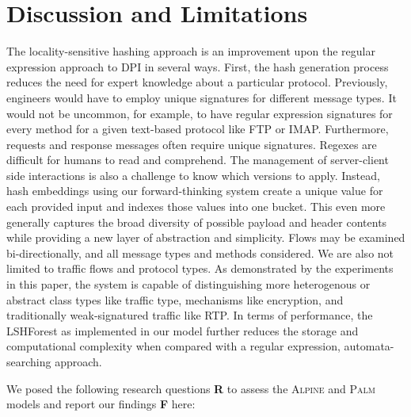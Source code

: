 \section{Discussion and Limitations}

The locality-sensitive hashing approach is an improvement upon the regular expression approach to DPI in several ways. First, the hash generation process reduces the need for expert knowledge about a particular protocol. Previously, engineers would have to employ unique signatures for different message types. It would not be uncommon, for example, to have regular expression signatures for every method for a given text-based protocol like FTP or IMAP. Furthermore, requests and response messages often require unique signatures. Regexes are difficult for humans to read and comprehend. The management of server-client side interactions is also a challenge to know which versions to apply. Instead, hash embeddings using our forward-thinking system create a unique value for each provided input and indexes those values into one bucket. This even more generally captures the broad diversity of possible payload and header contents while providing a new layer of abstraction and simplicity. Flows may be examined bi-directionally, and all message types and methods considered. We are also not limited to traffic flows and protocol types. As demonstrated by the experiments in this paper, the system is capable of distinguishing more heterogenous or abstract class types like traffic type, mechanisms like encryption, and traditionally weak-signatured traffic like RTP. In terms of performance, the LSHForest as implemented in our model further reduces the storage and computational complexity when compared with a regular expression, automata-searching approach.

We posed the following research questions \textbf{R} to assess the \textsc{Alpine} and \textsc{Palm} models and report our findings \textbf{F} here:

